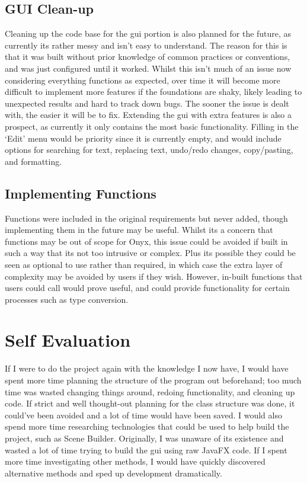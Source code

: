 \documentclass[
]{report}
\begin{document}
\subsection{GUI Clean-up}
Cleaning up the code base for the \acrshort{gui} portion is also planned for the
future, as currently its rather messy and isn't easy to understand. The
reason for this is that it was built without prior knowledge of common
practices or conventions, and was just configured until it worked.
Whilst this isn't much of an issue now considering everything functions
as expected, over time it will become more difficult to implement more
features if the foundations are shaky, likely leading to unexpected
results and hard to track down bugs. The sooner the issue is dealt with,
the easier it will be to fix. Extending the \acrshort{gui} with extra features is
also a prospect, as currently it only contains the most basic
functionality. Filling in the `Edit' menu would be priority since it is
currently empty, and would include options for searching for text,
replacing text, undo/redo changes, copy/pasting, and formatting.

\subsection{Implementing Functions}
Functions were included in the original requirements but never added,
though implementing them in the future may be useful. Whilst its a
concern that functions may be out of scope for Onyx, this issue could be
avoided if built in such a way that its not too intrusive or complex.
Plus its possible they could be seen as optional to use rather than
required, in which case the extra layer of complexity may be avoided by
users if they wish. However, in-built functions that users could call
would prove useful, and could provide functionality for certain
processes such as type conversion.

\section{Self Evaluation}
If I were to do the project again with the knowledge I now have, I would
have spent more time planning the structure of the program out
beforehand; too much time was wasted changing things around, redoing
functionality, and cleaning up code. If strict and well thought-out
planning for the class structure was done, it could've been avoided and
a lot of time would have been saved. I would also spend more time
researching technologies that could be used to help build the project,
such as Scene Builder. Originally, I was unaware of its existence and
wasted a lot of time trying to build the \acrshort{gui} using raw JavaFX code. If I
spent more time investigating other methods, I would have quickly
discovered alternative methods and sped up development dramatically.
\end{document}
